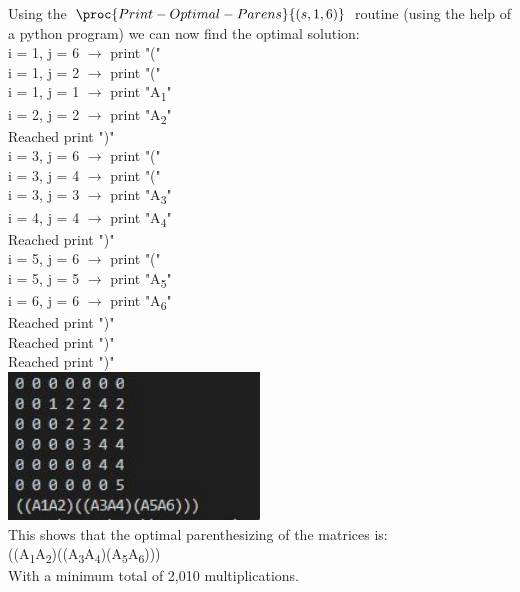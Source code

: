 \documentclass[addpoints,11pt]{exam}
\begin{document}
\begin{questions}
\begin{solutionorbox}
			Using the $\proc{Print-Optimal-Parens}{(s,1,6)}$ routine (using the help of a python program) we can now find the optimal solution:\\
			i = 1, j = 6 $\longrightarrow$ print "(" \\
			i = 1, j = 2 $\longrightarrow$ print "(" \\
			i = 1, j = 1 $\longrightarrow$ print  "A\textsubscript{1}"\\
			i = 2, j = 2 $\longrightarrow$ print "A\textsubscript{2}" \\
			Reached  print ")" \\
			i = 3, j = 6 $\longrightarrow$ print "(" \\
			i = 3, j = 4 $\longrightarrow$ print "(" \\
			i = 3, j = 3 $\longrightarrow$ print "A\textsubscript{3}" \\
			i = 4, j = 4 $\longrightarrow$ print "A\textsubscript{4}" \\
			Reached print ")" \\
			i = 5, j = 6 $\longrightarrow$ print "(" \\
			i = 5, j = 5 $\longrightarrow$ print "A\textsubscript{5}"\\
			i = 6, j = 6 $\longrightarrow$ print "A\textsubscript{6}"\\
			Reached print ")" \\
			Reached print ")" \\
			Reached print ")" \\
			\includegraphics[width=0.5\textwidth]{parens.JPG}\\
			This shows that the optimal parenthesizing of the matrices is: \\ ((A\textsubscript{1}A\textsubscript{2})((A\textsubscript{3}A\textsubscript{4})(A\textsubscript{5}A\textsubscript{6})))\\ With a minimum total of 2,010 multiplications.
		\end{solutionorbox}
		
		\ifprintanswers
		\newpage
		\else
		\bigskip
		\fi
		

\end{questions}
\end{document}
